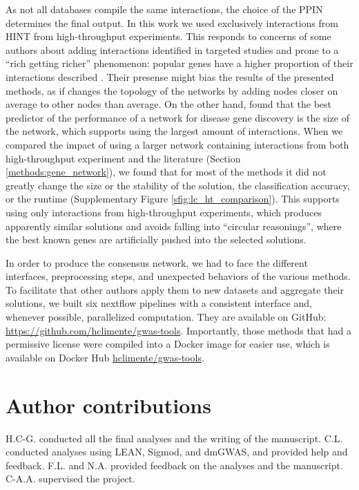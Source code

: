 \documentclass[twocolumn, 11pt, draft]{article}
\begin{document}
As not all databases compile the same interactions, the choice of the PPIN determines the final output. In this work we used exclusively interactions from HINT from high-throughput experiments. This responds to concerns of some authors about adding interactions identified in targeted studies and prone to a ``rich getting richer'' phenomenon: popular genes have a higher proportion of their interactions described \cite{cai_broker_2010,das_hint:_2012}. Their presense might bias the results of the presented methods, as if changes the topology of the networks by adding nodes closer on average to other nodes than average. On the other hand, \citet{huang_systematic_2018} found that the best predictor of the performance of a network for disease gene discovery is the size of the network, which supports using the largest amount of interactions. When we compared the impact of using a larger network containing interactions from both high-throughput experiment and the literature (Section \ref{methods:gene_network}), we found that for most of the methods it did not greatly change the size or the stability of the solution, the classification accuracy, or the runtime (Supplementary Figure \ref{sfig:lc_ht_comparison}). This supports using only interactions from high-throughput experiments, which produces apparently similar solutions and avoids falling into ``circular reasonings'', where the best known genes are artificially pushed into the selected solutions. 

In order to produce the consensus network, we had to face the different interfaces, preprocessing steps, and unexpected behaviors of the various methods. To facilitate that other authors apply them to new datasets and aggregate their solutions, we built six nextflow pipelines \cite{di_tommaso_nextflow_2017} with a consistent interface and, whenever possible, parallelized computation. They are available on GitHub: \url{https://github.com/hclimente/gwas-tools}. Importantly, those methods that had a permissive license were compiled into a Docker image for easier use, which is available on Docker Hub \href{https://hub.docker.com/r/hclimente/gwas-tools}{hclimente/gwas-tools}.

\section*{Author contributions}

H.C-G. conducted all the final analyses and the writing of the manuscript. C.L. conducted analyses using LEAN, Sigmod, and dmGWAS, and provided help and feedback. F.L. and N.A. provided feedback on the analyses and the manuscript. C-A.A. supervised the project.
\end{document}
